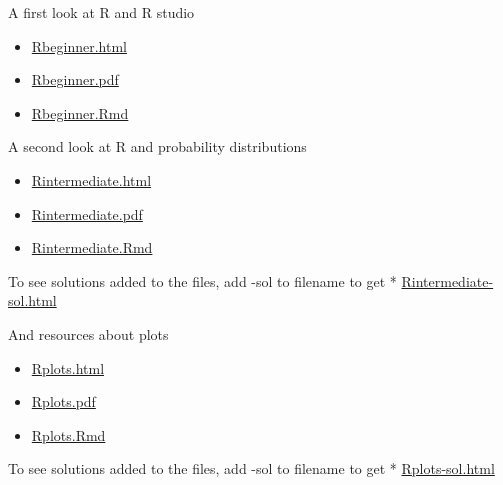\documentclass[ignorenonframetext,]{beamer}
\providecommand{\tightlist}{%
  \setlength{\itemsep}{0pt}\setlength{\parskip}{0pt}}
\begin{document}
\begin{frame}

\begin{block}{A first look at R and R studio}

\begin{itemize}
\tightlist
\item
  \href{https://www.math.ntnu.no/emner/TMA4268/2019v/1Intro/Rbeginner.html}{Rbeginner.html}
\item
  \href{https://www.math.ntnu.no/emner/TMA4268/2019v/1Intro/Rbeginner.pdf}{Rbeginner.pdf}
\item
  \href{https://www.math.ntnu.no/emner/TMA4268/2019v/1Intro/Rbeginner.Rmd}{Rbeginner.Rmd}
\end{itemize}

\end{block}

\end{frame}

\begin{frame}

\begin{block}{A second look at R and probability distributions}

\begin{itemize}
\tightlist
\item
  \href{https://www.math.ntnu.no/emner/TMA4268/2019v/1Intro/Rintermediate.html}{Rintermediate.html}
\item
  \href{https://www.math.ntnu.no/emner/TMA4268/2019v/1Intro/Rintermediate.pdf}{Rintermediate.pdf}
\item
  \href{https://www.math.ntnu.no/emner/TMA4268/2019v/1Intro/Rintermediate.Rmd}{Rintermediate.Rmd}
\end{itemize}

To see solutions added to the files, add -sol to filename to get *
\href{https://www.math.ntnu.no/emner/TMA4268/2019v/1Intro/Rintermediate-sol.html}{Rintermediate-sol.html}

\end{block}

\begin{block}{And resources about plots}

\begin{itemize}
\tightlist
\item
  \href{https://www.math.ntnu.no/emner/TMA4268/2019v/1Intro/Rplots.html}{Rplots.html}
\item
  \href{https://www.math.ntnu.no/emner/TMA4268/2019v/1Intro/Rplots.pdf}{Rplots.pdf}
\item
  \href{https://www.math.ntnu.no/emner/TMA4268/2019v/1Intro/Rplots.Rmd}{Rplots.Rmd}
\end{itemize}

To see solutions added to the files, add -sol to filename to get *
\href{https://www.math.ntnu.no/emner/TMA4268/2019v/1Intro/Rplots-sol.html}{Rplots-sol.html}

\end{block}

\end{frame}
\end{document}
